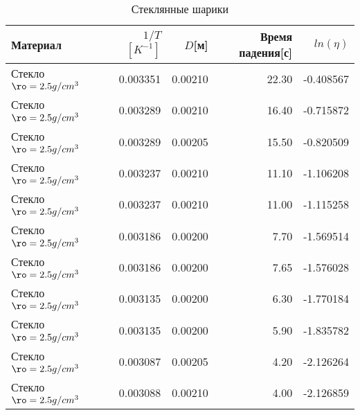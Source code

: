 \begin{table}
\centering
\caption{Стеклянные шарики}
\begin{tabular}{lrrrr}
\toprule
                 Материал &  $1/T$ $[K^{-1}]$ &  $D$[м] &  Время падения[с] &  $ln(\eta)$ \\
\midrule
Стекло $\ro = 2.5 g/cm^3$ &          0.003351 & 0.00210 &             22.30 &   -0.408567 \\
Стекло $\ro = 2.5 g/cm^3$ &          0.003289 & 0.00210 &             16.40 &   -0.715872 \\
Стекло $\ro = 2.5 g/cm^3$ &          0.003289 & 0.00205 &             15.50 &   -0.820509 \\
Стекло $\ro = 2.5 g/cm^3$ &          0.003237 & 0.00210 &             11.10 &   -1.106208 \\
Стекло $\ro = 2.5 g/cm^3$ &          0.003237 & 0.00210 &             11.00 &   -1.115258 \\
Стекло $\ro = 2.5 g/cm^3$ &          0.003186 & 0.00200 &              7.70 &   -1.569514 \\
Стекло $\ro = 2.5 g/cm^3$ &          0.003186 & 0.00200 &              7.65 &   -1.576028 \\
Стекло $\ro = 2.5 g/cm^3$ &          0.003135 & 0.00200 &              6.30 &   -1.770184 \\
Стекло $\ro = 2.5 g/cm^3$ &          0.003135 & 0.00200 &              5.90 &   -1.835782 \\
Стекло $\ro = 2.5 g/cm^3$ &          0.003087 & 0.00205 &              4.20 &   -2.126264 \\
Стекло $\ro = 2.5 g/cm^3$ &          0.003088 & 0.00210 &              4.00 &   -2.126859 \\
\bottomrule
\end{tabular}
\end{table}
